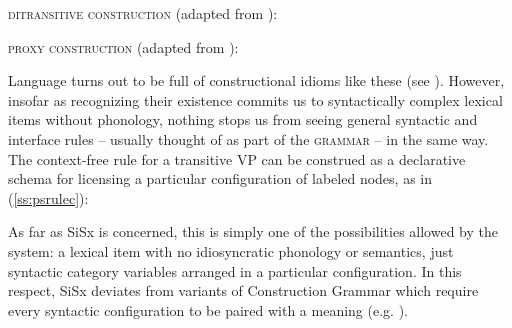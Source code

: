 \documentclass[output=paper,hidelinks]{langscibook}
\begin{document}
\begin{exe}
\ex\textsc{ditransitive construction} (adapted from \citealt[40]{culicover2019origin}): \label{ss:dobc}
\begin{xlist}
 \end{xlist}
\end{exe}

\begin{exe}
\ex\textsc{proxy construction} (adapted from \citealt[11]{varaschin2020anti}): \label{ss:prc}
\begin{xlist}
 \end{xlist}
\end{exe}




Language turns out to be full of constructional idioms like these (see \citealt{goldberg1995constructions, jackendoff1997the-architecture, jackendoff2008construction, culicover1999syntactic}). However,  insofar as recognizing their existence commits us to syntactically complex lexical items without phonology, nothing stops us from seeing general syntactic and interface rules – usually thought of as part of the \textsc{grammar} – in the same way. The context-free rule for a transitive VP can be construed as a declarative schema for licensing a particular configuration of labeled nodes, as in (\ref{ss:psrulec}):

\begin{exe}
\label{ss:psrulec}
\end{exe}

As far as SiSx is concerned, this is simply one of the possibilities allowed by the system: a lexical item with no idiosyncratic phonology or semantics, just syntactic category variables arranged in a particular configuration. In this respect, SiSx deviates from variants of Construction Grammar which require every syntactic configuration to be paired with a meaning (e.g. \cite{goldberg1995constructions}).
\end{document}
